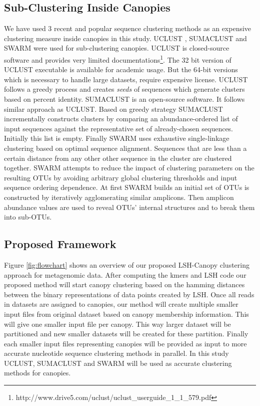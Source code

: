 \documentclass[10pt, conference, compsocconf]{IEEEtran}
\begin{document}
\subsection{Sub-Clustering Inside Canopies}
We have used 3 recent and popular sequence clustering methods as an expensive clustering measure inside canopies in this study. UCLUST \cite{MARuclust}, SUMACLUST \cite{MARSumaclust} and SWARM \cite{MARSwarm} were used for sub-clustering canopies. UCLUST is closed-source software and provides very limited documentations\footnote{http://www.drive5.com/uclust/uclust\_userguide\_1\_1\_579.pdf}. The 32 bit version of UCLUST executable is available for academic usage. But the 64-bit versions which is necessary to handle large datasets, require expensive license. UCLUST follows a greedy process and creates \textit{seeds} of sequences which generate clusters based on percent identity.
SUMACLUST is an open-source software. It follows similar approach as UCLUST. Based on greedy strategy SUMACLUST incrementally constructs clusters by comparing an abundance-ordered list of input sequences against the representative set of already-chosen sequences. Initially this list is empty. Finally SWARM uses exhaustive single-linkage clustering based on optimal sequence alignment. Sequences that are less than a certain distance from any other other sequence in the cluster are clustered together. SWARM attempts to reduce the impact of clustering parameters on the resulting OTUs by avoiding arbitrary global clustering thresholds and input sequence ordering dependence. At first SWARM builds an initial set of OTUs is constructed by iteratively agglomerating similar amplicons. Then amplicon abundance values are used to reveal OTUs’ internal structures and to break them into sub-OTUs.  

\subsection{Proposed Framework}
Figure \ref{fig:flowchart} shows an overview of our proposed LSH-Canopy clustering approach for metagenomic data. After computing the kmers and LSH code our proposed method will start canopy clustering based on the hamming distances between the binary representations of data points created by LSH. Once all reads in datasets are assigned to canopies, our method will create multiple smaller input files from original dataset based on canopy membership information. This will give one smaller input file per canopy. This way larger dataset will be partitioned and new smaller datasets will be created for these partition. Finally each smaller input files representing canopies will be provided as input to more accurate nucleotide sequence clustering methods in parallel. In this study UCLUST, SUMACLUST and SWARM will be used as accurate clustering methods for canopies.  
\end{document}
